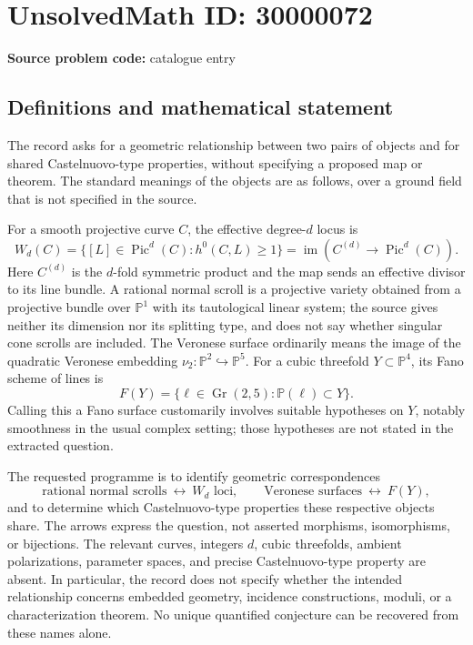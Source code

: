 \documentclass[11pt]{article}
\newcommand{\PP}{\mathbb{P}}
\begin{document}
\section*{UnsolvedMath ID: 30000072}
\textbf{Source problem code:} catalogue entry
\subsection{Definitions and mathematical statement}
The record asks for a geometric relationship between two pairs of objects and for shared Castelnuovo-type properties, without specifying a proposed map or theorem. The standard meanings of the objects are as follows, over a ground field that is not specified in the source.

For a smooth projective curve \(C\), the effective degree-\(d\) locus is
\[
W_d(C)=\{[L]\in\operatorname{Pic}^d(C):h^0(C,L)\geq1\}
=\operatorname{im}(C^{(d)}\longrightarrow\operatorname{Pic}^d(C)).
\]
Here \(C^{(d)}\) is the \(d\)-fold symmetric product and the map sends an effective divisor to its line bundle. A rational normal scroll is a projective variety obtained from a projective bundle over \(\PP^1\) with its tautological linear system; the source gives neither its dimension nor its splitting type, and does not say whether singular cone scrolls are included. The Veronese surface ordinarily means the image of the quadratic Veronese embedding \(\nu_2:\PP^2\hookrightarrow\PP^5\). For a cubic threefold \(Y\subset\PP^4\), its Fano scheme of lines is
\[
F(Y)=\{\ell\in\operatorname{Gr}(2,5):\PP(\ell)\subset Y\}.
\]
Calling this a Fano surface customarily involves suitable hypotheses on \(Y\), notably smoothness in the usual complex setting; those hypotheses are not stated in the extracted question.

The requested programme is to identify geometric correspondences
\[
\text{rational normal scrolls}\ \longleftrightarrow\ W_d\text{ loci},
\qquad
\text{Veronese surfaces}\ \longleftrightarrow\ F(Y),
\]
and to determine which Castelnuovo-type properties these respective objects share. The arrows express the question, not asserted morphisms, isomorphisms, or bijections. The relevant curves, integers \(d\), cubic threefolds, ambient polarizations, parameter spaces, and precise Castelnuovo-type property are absent. In particular, the record does not specify whether the intended relationship concerns embedded geometry, incidence constructions, moduli, or a characterization theorem. No unique quantified conjecture can be recovered from these names alone.
\end{document}
